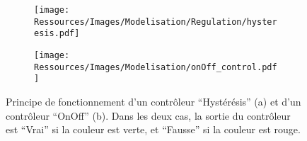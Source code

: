 \begin{figure}
    \centering
    \begin{subfigure}[b]{0.35\textwidth}
        \centering
        \texttt{[image: Ressources/Images/Modelisation/Regulation/hysteresis.pdf]}
        \caption{}
        \label{fig:hysteresis}
    \end{subfigure}
    \quad
    \begin{subfigure}[b]{0.6\textwidth}
        \centering
        \texttt{[image: Ressources/Images/Modelisation/onOff\_control.pdf]}
        \caption{}
        \label{fig:onOff}
    \end{subfigure}
    \caption[Types de Contrôleurs]
             {Principe de fonctionnement d’un contrôleur \enquote{Hystérésis} (a)
              et d’un contrôleur \enquote{OnOff} (b). Dans les deux cas, la sortie
              du contrôleur est \enquote{Vrai} si la couleur est verte, et \enquote{Fausse}
              si la couleur est rouge.}
    \label{fig:types_controleurs}
\end{figure}

